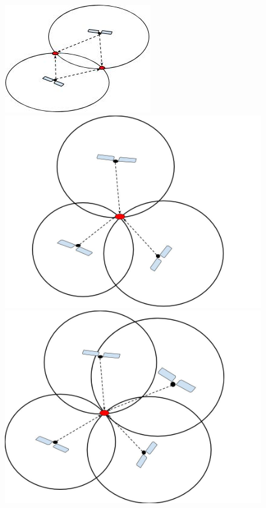 \begin{figure}[h!]
\begin{minipage}[t]{0.3\textwidth}
\includegraphics[width=\textwidth]{Background/BasisGNSS2Sat}
\end{minipage}
\begin{minipage}[t]{0.3\textwidth}
\includegraphics[width=\textwidth]{Background/BasisGNSS3Sat}
\end{minipage}
\begin{minipage}[t]{0.3\textwidth}
\includegraphics[width=\textwidth]{Background/BasisGNSS4Sat}

\end{minipage}
\end{figure}
